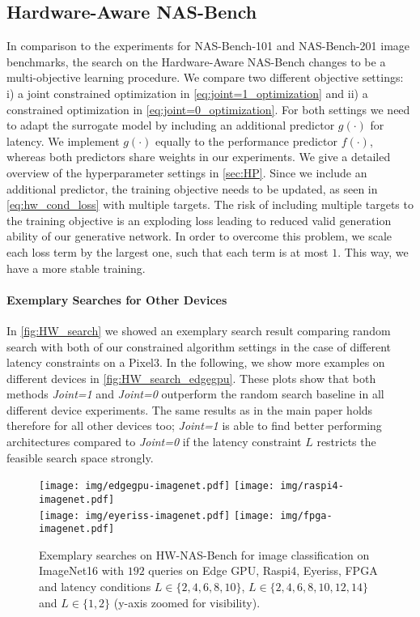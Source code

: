 \documentclass[runningheads]{llncs}
\begin{document}
\subsection{Hardware-Aware NAS-Bench}
In comparison to the experiments for NAS-Bench-101 \cite{2019NB101} and NAS-Bench-201 \cite{2020NB201} image benchmarks, the search on the Hardware-Aware NAS-Bench \cite{2021HWNNB} changes to be a multi-objective learning procedure.
We compare two different objective settings: i) a joint constrained optimization in \autoref{eq:joint=1_optimization}
and ii) a constrained optimization in \autoref{eq:joint=0_optimization}.
For both settings we need to adapt the surrogate model by including an additional predictor $g(\cdot)$ for latency.
We implement $g(\cdot)$ equally to the performance predictor $f(\cdot)$, whereas both predictors share weights in our experiments.
We give a detailed overview of the hyperparameter settings in \autoref{sec:HP}.
Since we include an additional predictor, the training objective needs to be updated, as seen in \autoref{eq:hw_cond_loss} with multiple targets.
The risk of including multiple targets to the training objective is an exploding loss leading to reduced valid generation ability of our generative network.
In order to overcome this problem, we scale each loss term by the largest one, such that each term is at most $1$.
This way, we have a more stable training.

\paragraph{Exemplary Searches for Other Devices}
In \autoref{fig:HW_search} we showed an exemplary search result comparing random search with both of our constrained algorithm settings in the case of different latency constraints on a Pixel3.
In the following, we show more examples on different devices in \autoref{fig:HW_search_edgegpu}.
These plots show that both methods \textit{Joint=1} and \textit{Joint=0} outperform the random search baseline in all different device experiments. The same results as in the main paper holds therefore for all other devices too; \textit{Joint=1} is able to find better performing architectures compared to \textit{Joint=0} if the latency constraint $L$ restricts the feasible search space strongly.


\begin{figure}[ht]
	\centering
	\texttt{[image: img/edgegpu-imagenet.pdf]}
	\texttt{[image: img/raspi4-imagenet.pdf]}\\
	\texttt{[image: img/eyeriss-imagenet.pdf]}
	\texttt{[image: img/fpga-imagenet.pdf]}
	\caption{
		Exemplary searches on HW-NAS-Bench for image classification on ImageNet16 with $192$ queries on Edge GPU, Raspi4, Eyeriss, FPGA and latency conditions $L\in\{2,4,6,8,10\}$, $L\in\{2,4,6,8,10,12,14\}$ and $L\in\{1,2\}$ (y-axis zoomed for visibility).\label{fig:HW_search_edgegpu} \label{fig:HW_search_raspi4} \label{fig:HW_search_eyeriss} \label{fig:HW_search_fpga}}
\end{figure}
\end{document}
